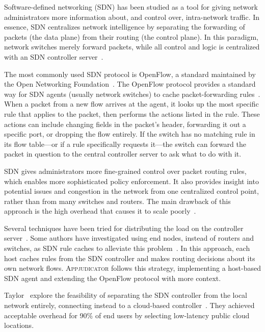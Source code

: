 Software-defined networking (SDN) has been studied as a tool for giving network
administrators more information about, and control over, intra-network traffic.
In essence, SDN centralizes network intelligence by separating the forwarding of
packets (the data plane) from their routing (the control plane). In this
paradigm, network switches merely forward packets, while all control and logic
is centralized with an SDN controller server~\cite{kim2013}.

The most commonly used SDN protocol is OpenFlow, a standard maintained by the
Open Networking Foundation~\cite{erickson2011}. The OpenFlow protocol provides a
standard way for SDN agents (usually network switches) to cache
packet-forwarding rules~\cite{openflowspec}. When a packet from a new flow
arrives at the agent, it looks up the most specific rule that applies to the
packet, then performs the actions listed in the rule. These actions can include
changing fields in the packet's header, forwarding it out a specific port, or
dropping the flow entirely. If the switch has no matching rule in its flow
table---or if a rule specifically requests it---the switch can forward the
packet in question to the central controller server to ask what to do with it.

SDN gives administrators more fine-grained control over packet routing rules,
which enables more sophisticated policy enforcement. It also provides insight
into potential issues and congestion in the network from one centralized control
point, rather than from many switches and routers. The main drawback of this
approach is the high overhead that causes it to scale
poorly~\cite{benzekki2016}.

Several techniques have been tried for distributing the load on the controller
server~\cite{oktian2017, dixit2013}. Some authors have investigated using end
nodes, instead of routers and switches, as SDN rule caches to alleviate this
problem~\cite{taylor2017, chuluundorj2019}. In this approach, each host caches
rules from the SDN controller and makes routing decisions about its own network
flows. \textsc{Appjudicator} follows this strategy, implementing a host-based
SDN agent and extending the OpenFlow protocol with more context.

Taylor ~\etal explore the feasibility of separating the SDN controller from the
local network entirely, connecting instead to a cloud-based
controller~\cite{taylor2017shue}. They achieved acceptable overhead for 90\% of
end users by selecting low-latency public cloud locations.

